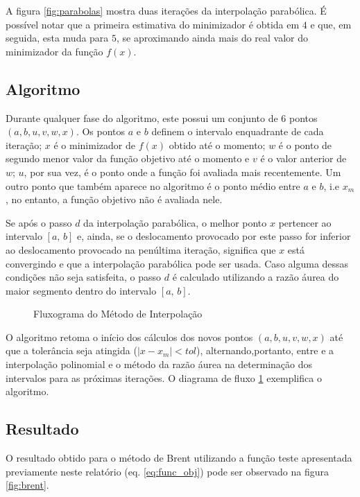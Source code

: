 \documentclass[a4paper,12pt,utf8x,notitlepage]{article}
\begin{document}
A figura \ref{fig:parabolas} mostra duas iterações da interpolação parabólica. É possível notar que a primeira estimativa do minimizador é obtida em $4$ e que, em seguida, esta muda para $5$, se aproximando ainda mais do real valor do minimizador da função $f(x)$.
 
\subsection{Algoritmo}

Durante qualquer fase do algoritmo, este possui um conjunto de 6 pontos $(a, b, u, v, w, x)$. Os pontos $a$ e $b$ definem o intervalo enquadrante de cada iteração; $x$ é o minimizador de $f(x)$ obtido até o momento; $w$ é o ponto de segundo menor valor da função objetivo até o momento e $v$ é o valor anterior de $w$; $u$, por sua vez,  é o ponto onde a função foi avaliada mais recentemente. Um outro ponto que também aparece no algoritmo é o ponto médio entre $a$ e $b$, i.e $x_m$, no entanto, a função objetivo não é avaliada nele.

Se após o passo $d$ da interpolação parabólica, o melhor ponto $x$ pertencer ao intervalo $[a, \, b]$ e, ainda, se o deslocamento provocado por este passo for inferior ao deslocamento provocado na penúltima iteração, significa que $x$ está convergindo e que a interpolação parabólica pode ser usada. Caso alguma dessas condições não seja satisfeita, o passo $d$ é calculado utilizando a razão áurea do maior segmento dentro do intervalo $[a, \,b]$.

\begin{figure}[h!]
\centering
\scalebox{.85}{}
\caption{Fluxograma do Método de Interpolação}
\label{fig:brentFlow}
\end{figure}

O algoritmo retoma o início dos cálculos dos novos pontos $(a, b, u, v, w, x)$ até que a tolerância seja atingida ($ |x-x_m| < tol $), alternando,portanto, entre e a interpolação polinomial e o método da razão áurea na determinação dos intervalos para as próximas iterações. O diagrama de fluxo \ref{fig:brentFlow} exemplifica o algoritmo.

\subsection{Resultado}

O resultado obtido para o método de Brent utilizando a função teste apresentada previamente neste relatório (eq. \ref{eq:func_obj}) pode ser observado na figura \ref{fig:brent}.\\
\end{document}
